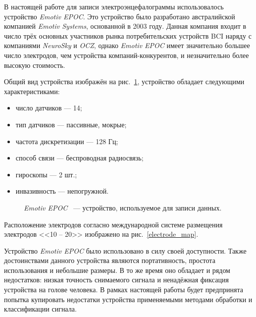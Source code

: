 \documentclass[12pt,fleqn]{article}
\begin{document}
	
	\par В настоящей работе для записи электроэнцефалограммы использовалось устройство {\it Emotiv EPOC}. Это устройство было разработано австралийской компанией {\it Emotiv Systems}, основанной в 2003 году. Данная компания входит в число трёх основных участников рынка потребительских устройств BCI наряду с компаниями {\it NeuroSky} и {\it OCZ}, однако {\it Emotiv EPOC} имеет значительно большее число электродов, чем устройства компаний-конкурентов, и незначительно более высокую стоимость. 
	\par Общий вид устройства изображён на рис.~\ref{Emotiv}, устройство обладает следующими характеристиками:
	\begin{itemize}\itemsep0pt
	\item
	число датчиков — 14;
	\item
	тип датчиков — пассивные, мокрые;
	\item
	частота дискретизации — 128 Гц;
	\item
	способ связи — беспроводная радиосвязь;
	\item
	гироскопы — 2 шт.;
	\item
	инвазивность — непогружной.
	\end{itemize}

	\begin{figure}[H]
	\caption{{\it Emotiv EPOC} ~--- устройство, используемое для записи данных.}
	\label{Emotiv}
	\end{figure}

	\par Расположение электродов согласно международной системе размещения электродов <<10 -- 20>> изображено на рис.~\ref{electrode_map}.
	\par Устройство {\it Emotiv EPOC} было использовано в силу своей доступности. Также достоинствами данного устройства являются портативность, простота использования и небольшие размеры. В то же время оно обладает и рядом недостатков: низкая точность снимаемого сигнала и ненадёжная фиксация устройства на голове человека. В рамках настоящей работы будет предпринята попытка купировать недостатки устройства применяемыми методами обработки и классификации сигнала.
\end{document}
